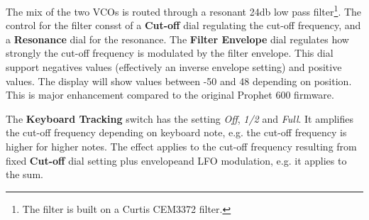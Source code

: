 The mix of the two VCOs is routed through a resonant 24db low pass filter\footnote{The filter is built on a Curtis CEM3372 filter.}. The control for the filter consst of a \textbf{Cut-off} dial regulating the cut-off frequency, and a \textbf{Resonance} dial for the resonance. The \textbf{Filter Envelope} dial regulates how strongly the cut-off frequency is modulated by the filter envelope. This dial support negatives values (effectively an inverse envelope setting) and positive values. The display will show values between -50 and 48 depending on position. This is major enhancement compared to the original Prophet 600 firmware.

\begin{center}
\end{center}

The \textbf{Keyboard Tracking} switch has the setting \textit{Off}, \textit{1/2} and \textit{Full}. It amplifies the cut-off frequency depending on keyboard note, e.g. the cut-off frequency is higher for higher notes. The effect applies to the cut-off frequency resulting from fixed \textbf{Cut-off} dial setting plus envelopeand LFO modulation, e.g. it applies to the sum.  
